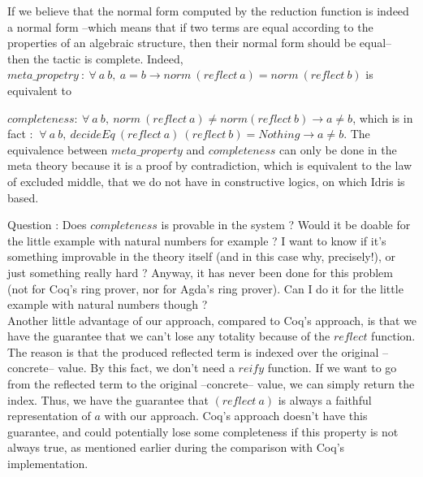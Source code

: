 If we believe that the normal form computed by the reduction function is indeed a normal form --which means that if two terms are equal according to the properties of an algebraic structure, then their normal form should be equal-- then the tactic is complete.
Indeed, 
$meta\_propetry\ :\ \forall\ a\ b,\ a=b \rightarrow norm\ (reflect\ a) = norm\ (reflect\ b)$ is equivalent to

$completeness : \ \forall\ a\ b,\ norm\ (reflect\ a) \neq norm(reflect\ b) \rightarrow a \neq b$, which is in fact :
$\ \forall\ a\ b,\ decideEq\ (reflect\ a)\ (reflect\ b) = Nothing \rightarrow a \neq b$. The equivalence between $meta\_property$ and $completeness$ can only be done in the meta theory because it is a proof by contradiction, which is equivalent to the law of excluded middle, that we do not have in constructive logics, on which Idris is based.

Question : Does $completeness$ is provable in the system ? Would it be doable for the little example with natural numbers for example ? I want to know if it's something improvable in the theory itself (and in this case why, precisely!), or just something really hard ?
Anyway, it has never been done for this problem (not for Coq's ring prover, nor for Agda's ring prover). Can I do it for the little example with natural numbers though ? \\

Another little advantage of our approach, compared to Coq's approach, is that we have the guarantee that we can't lose any totality because of the $reflect$ function. The reason is that the produced reflected term is indexed over the original --concrete-- value. By this fact, we don't need a $reify$ function. If we want to go from the reflected term to the original --concrete-- value, we can simply return the index. Thus, we have the guarantee that $(reflect\ a)$ is always a faithful representation of $a$ with our approach. Coq's approach doesn't have this guarantee, and could potentially lose some completeness if this property is not always true, as mentioned earlier during the comparison with Coq's implementation.